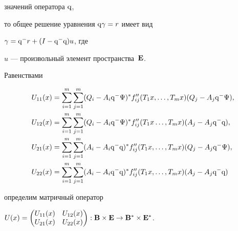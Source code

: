 значений оператора $\mathrm{q}$,


то общее решение уравнения $\mathrm{q}\gamma=r$ имеет вид


$\gamma=\mathrm{q}^{-}r+(I-\mathrm{q}^{-}\mathrm{q})u$, где


$u$ --- произвольный элемент пространства~$\bold E{}$.





Равенствами


\begin{align*}


U_{11}(x)&=\sum_{i=1}^m\sum_{j=1}^m(Q_i-A_i\q^-\Psi)^*


f''_{ij}(T_1x,\dotsc,T_mx)(Q_j-A_j\q^-\Psi),\\


%


U_{12}(x)&=\sum_{i=1}^m\sum_{j=1}^m(Q_i-A_i\q^-\Psi)^*


f''_{ij}(T_1 x\dotsc,T_mx)(A_j-A_j\q^-\q),\\


%


U_{21}(x)&=\sum_{i=1}^m\sum_{j=1}^m(A_i-A_i\q^-\q)^*


f''_{ij}(T_1x,\dotsc,T_mx)(Q_j-A_j\q^-\Psi), \\


%


U_{22}(x)&=\sum_{i=1}^m\sum_{j=1}^m(A_i-A_i\q^-\q)^*


f''_{ij}(T_1x,\dotsc,T_mx)(A_j-A_j\q^-\q)


\end{align*}


определим матричный оператор


$U(x)=\begin{pmatrix}


U_{11}(x)&U_{12}(x)\\


U_{21}(x)&U_{22}(x)


\end{pmatrix}


:\spc{B}


\times\spc{E}\to\spc{B}^*\times\spc{E}^*$.\medskip





